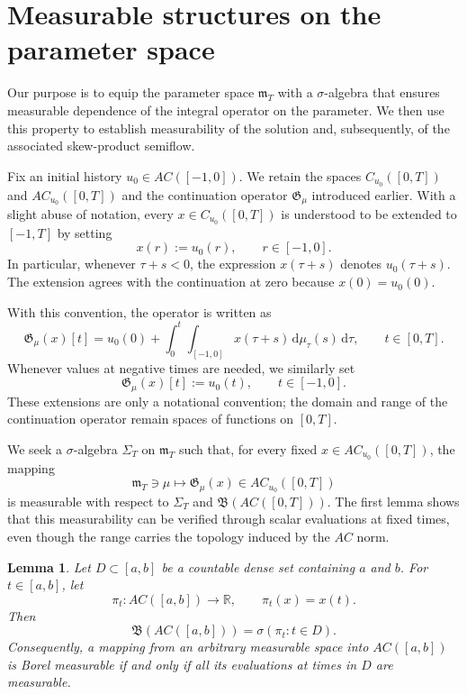 \documentclass[reqno]{amsart}
\theoremstyle{plain}
\newtheorem{lemma}{Lemma}[section]
\numberwithin{equation}{section}
\numberwithin{definition}{section}
\newcommand{\dd}{\ensuremath{\mathrm{d}}}
\begin{document}
{\section{Measurable structures on the parameter space}\label{sec:Measurable-structures}
Our purpose is to equip the parameter space $\mathfrak m_T$
with a $\sigma$-algebra that ensures measurable dependence
of the integral operator on the parameter. We then use this
property to establish measurability of the solution and,
subsequently, of the associated skew-product semiflow.

Fix an initial history $u_0\in AC([-1,0])$.
We retain the spaces $C_{u_0}([0,T])$ and
$AC_{u_0}([0,T])$ and the continuation operator
$\mathfrak G_\mu$ introduced earlier.
With a slight abuse of notation, every
$x\in C_{u_0}([0,T])$ is understood to be extended to
$[-1,T]$ by setting
\begin{equation*}
    x(r):=u_0(r),
    \qquad r\in[-1,0].
\end{equation*}
In particular, whenever $\tau+s<0$, the expression
$x(\tau+s)$ denotes $u_0(\tau+s)$.
The extension agrees with the continuation at zero
because $x(0)=u_0(0)$.

With this convention, the operator is written as
\begin{equation*}
    \mathfrak G_\mu (x)[t]
    =
    u_0(0)
    +
    \int_0^t\int_{[-1,0]}
        x(\tau+s)\,\dd\mu_\tau(s)\,\dd\tau,
    \qquad t\in[0,T].
\end{equation*}
Whenever values at negative times are needed, we similarly
set
\begin{equation*}
     \mathfrak G_\mu (x)[t]:=u_0(t),
    \qquad t\in[-1,0].
\end{equation*}
These extensions are only a notational convention;
the domain and range of the continuation operator remain
spaces of functions on $[0,T]$.

We seek a $\sigma$-algebra $\Sigma_T$ on $\mathfrak m_T$
such that, for every fixed $x\in AC_{u_0}([0,T])$,
the mapping
\begin{equation*}
    \mathfrak m_T\ni\mu
    \mapsto\mathfrak G_\mu (x)
    \in AC_{u_0}([0,T])
\end{equation*}
is measurable with respect to
$\Sigma_T$ and $\mathfrak B(AC([0,T]))$.
The first lemma shows that this measurability can be
verified through scalar evaluations at fixed times,
even though the range carries the topology induced
by the $AC$ norm.

\begin{lemma}\label{lem:AC-evaluations}
Let $D\subset[a,b]$ be a countable dense set containing
$a$ and $b$. For $t\in[a,b]$, let
\begin{equation*}
    \pi_t:AC([a,b])\to\mathbb R,
    \qquad
    \pi_t(x)=x(t).
\end{equation*}
Then
\begin{equation*}
    \mathfrak{B}(AC([a,b]))
    =
    \sigma(\pi_t:t\in D).
\end{equation*}
Consequently, a mapping from an arbitrary measurable space
into $AC([a,b])$ is Borel measurable if and only if
all its evaluations at times in $D$ are measurable.
\end{lemma}

}
\end{document}
